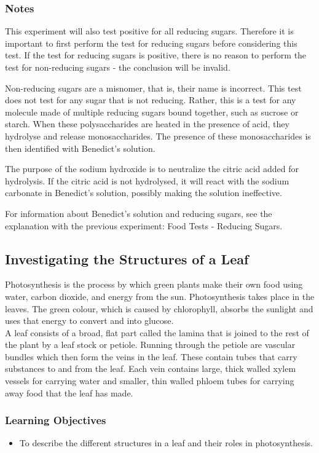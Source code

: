 \subsubsection*{Notes}
This experiment will also test positive for all reducing sugars. Therefore it is important to first perform the test for reducing sugars before considering this test. If the test for reducing sugars is positive, there is no reason to perform the test for non-reducing sugars - the conclusion will be invalid.

Non-reducing sugars are a misnomer, that is, their name is incorrect. This test does not test for any sugar that is not reducing. Rather, this is a test for any molecule made of multiple reducing sugars bound together, such as sucrose or starch. When these polysaccharides are heated in the presence of acid, they hydrolyse and release monosaccharides. The presence of these monosaccharides is then identified with Benedict's solution.

The purpose of the sodium hydroxide is to neutralize the citric acid added for hydrolysis. If the citric acid is not hydrolysed, it will react with the sodium carbonate in Benedict's solution, possibly making the solution ineffective.

For information about Benedict's solution and reducing sugars, see the explanation with the previous experiment: Food Tests - Reducing Sugars.

\subsection{Investigating the Structures of a Leaf}
Photosynthesis is the process by which green plants make their own food using water, carbon dioxide, and energy from the sun. Photosynthesis takes place in the leaves. The green colour, which is caused by chlorophyll, absorbs the sunlight and uses that energy to convert  and  into glucose. \\A leaf consists of a broad, flat part called the lamina that is joined to the rest of the plant by a leaf stock or petiole. Running through the petiole are vascular bundles which then form the veins in the leaf. These contain tubes that carry substances to and from the leaf. Each vein contains large, thick walled xylem vessels for carrying water and smaller, thin walled phloem tubes for carrying away food that the leaf has made.

\subsubsection*{Learning Objectives}
\begin{itemize}
\item{To describe the different structures in a leaf and their roles in photosynthesis.}
\end{itemize}

